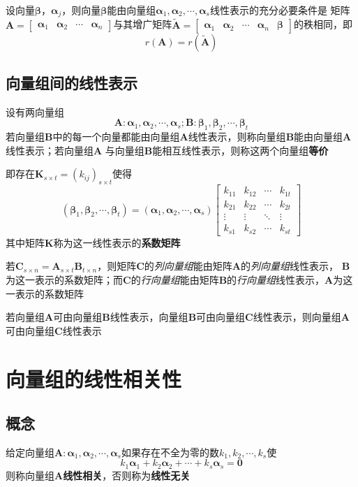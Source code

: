 \documentclass[UTF8]{ctexart}
\newcommand{\ve}[1]{{\bm{#1}}}
\newcommand{\mat}[1]{\ve{#1}}
\newcommand{\emplin}{\vspace{1em}}
\begin{document}
设向量$\mat{\beta}$，$\mat{\alpha}_j$，则向量$\mat{\beta}$能由向量组$\mat{\alpha}_1,\mat{\alpha}_2,\cdots,\mat{\alpha}_s$线性表示的充分必要条件是
矩阵$\mat{A}=\begin{bmatrix}
  \mat{\alpha}_1&\mat{\alpha}_2&\cdots&\mat{\alpha}_n
\end{bmatrix}$与其增广矩阵$\widetilde{\mat{A}}=\begin{bmatrix}
  \mat{\alpha}_1&\mat{\alpha}_2&\cdots&\mat{\alpha}_n&\mat{\beta}
\end{bmatrix}$的秩相同，即
\[r(\mat{A})=r(\widetilde{\mat{A}})\]

\subsection*{向量组间的线性表示}
设有两向量组
\[\mat{A}:\mat{\alpha}_1,\mat{\alpha}_2,\cdots,\mat{\alpha}_s;\mat{B}:\mat{\beta}_1,\mat{\beta}_2,\cdots,\mat{\beta}_t\]
若向量组$\mat{B}$中的每一个向量都能由向量组$\mat{A}$线性表示，则称向量组$\mat{B}$能由向量组$\mat{A}$线性表示；若向量组$\mat{A}$
与向量组$\mat{B}$能相互线性表示，则称这两个向量组\textbf{等价}

即存在$\mat{K}_{s\times t}=(k_{ij})_{s\times t}$使得
\[(\mat{\beta}_1,\mat{\beta}_2,\cdots,\mat{\beta}_t)=(\mat{\alpha}_1,\mat{\alpha}_2,\cdots,\mat{\alpha}_s)
\begin{bmatrix}
  k_{11}&k_{12}&\cdots&k_{1t}\\
  k_{21}&k_{22}&\cdots&k_{2t}\\
  \vdots&\vdots&\ddots&\vdots\\
  k_{s1}&k_{s2}&\cdots&k_{st}
\end{bmatrix}\]
其中矩阵$\mat{K}$称为这一线性表示的\textbf{系数矩阵}

\emplin

若$\mat{C}_{s\times n}=\mat{A}_{s\times t}\mat{B}_{t\times n}$，则矩阵$\mat{C}$的\emph{列向量组}能由矩阵$\mat{A}$的\emph{列向量组}线性表示，
$\mat{B}$为这一表示的系数矩阵；而$\mat{C}$的\emph{行向量组}能由矩阵$\mat{B}$的\emph{行向量组}线性表示，$\mat{A}$为这一表示的系数矩阵

\emplin

若向量组$\mat{A}$可由向量组$\mat{B}$线性表示，向量组$\mat{B}$可由向量组$\mat{C}$线性表示，则向量组$\mat{A}$可由向量组$\mat{C}$线性表示

\section*{向量组的线性相关性}
\subsection*{概念}
给定向量组$\mat{A}:\mat{\alpha}_1,\mat{\alpha}_2,\cdots,\mat{\alpha}_s$如果存在不全为零的数$k_1,k_2,\cdots,k_s$使
\[k_1\mat{\alpha}_1+k_2\mat{\alpha}_2+\cdots+k_s\mat{\alpha}_s=\mat{0}\]
则称向量组$\mat{A}$\textbf{线性相关}，否则称为\textbf{线性无关}
\end{document}
